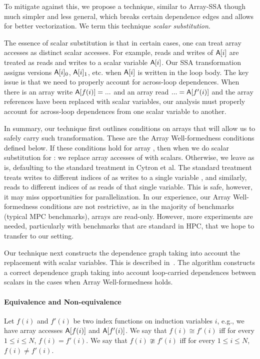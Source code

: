 To mitigate against this, we propose a technique, similar to Array-SSA though much simpler and 
less general, which breaks certain dependence edges and allows for better vectorization. 
We term this technique \emph{scalar substitution}.


The essence of scalar substitution is that in certain cases, one can treat array accesses as distinct scalar accesses.
For example, reads and writes of ${\sf A}[i]$ are treated as reads and writes to a scalar variable ${\sf A}[i]$.
Our SSA transformation assigns versions ${\sf A}[i]_0$, ${\sf A}[i]_1$, etc. when ${\sf A}[i]$ is written in the loop body. 
The key issue is that we need to properly account for across-loop dependences. When there is an array write 
${\sf A}[f(i)] = ...$ and an array read $ ... = {\sf A}[f'(i)]$ and the array references have been replaced with scalar variables, 
our analysis must properly account for across-loop dependences from one scalar variable to another.

In summary, our technique first outlines conditions on arrays that will allow us to safely carry such transformation.
These are the Array Well-formedness conditions defined below. If these conditions hold for array \A, then when 
we do scalar substitution for \A: we replace 
array accesses of {\A} with scalars. Otherwise, we leave {\A} as is, defaulting to the standard treatment in Cytron et al. 
The standard treatment treats writes to different indices of {\A} as writes to a single variable {\A}, and similarly, reads
to different indices of {\A} as reads of that single variable. This is safe, however, it may miss opportunities for
parallelization. In our experience, our Array Well-formedness conditions are not restrictive, as in the majority of benchmarks
(typical MPC benchmarks), arrays are read-only. However, more experiments are needed, particularly 
with benchmarks that are standard in HPC, that we hope to transfer to our setting. 

Our technique next constructs the dependence graph taking into account the replacement with scalar variables. 
This is described in~. The algorithm constructs a correct dependence graph taking into 
account loop-carried dependences between scalars in the cases when Array Well-formedness holds.

\paragraph {Equivalence and Non-equivalence} Let $f(i)$ and $f'(i)$ be two index functions on induction variables $i$, 
e.g., we have array accesses ${{\sf A}}[f(i)]$ and ${{\sf A}}[f'(i)]$. We say that $f(i) \cong f'(i)$ iff for every $1 \le i \le N$,
$f(i) = f'(i)$. We say that $f(i) \ncong f'(i)$ iff for every $1 \le i \le N$, $f(i) \neq f'(i)$. 


